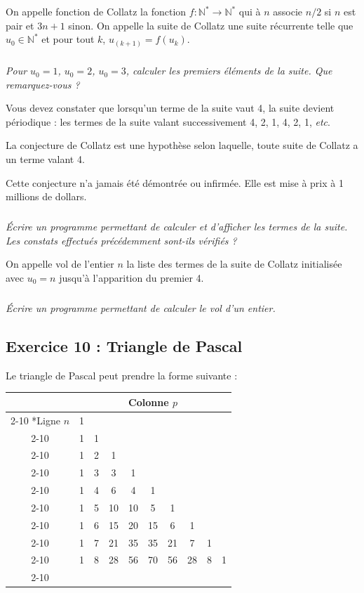 \documentclass[10pt]{article}
\begin{document}
On appelle fonction de Collatz la fonction $f:\mathbb{N}^* \to  \mathbb{N}^*$ qui à $n$ associe $n/2$ si $n$ est pair et $3n+1$ sinon.
On appelle la suite de Collatz une suite récurrente telle que $u_0\in \mathbb{N}^*$ et pour tout $k$, $u_(k+1)=f(u_k)$.

\subparagraph{}
\textit{Pour $u_0=1$, $u_0=2$, $u_0=3$, calculer les premiers éléments de la suite. Que remarquez-vous ?}

\begin{rem}
	Vous devez constater que lorsqu’un terme de la suite vaut 4, la suite devient périodique : les termes de la suite valant successivement 4, 2, 1, 4, 2, 1, \textit{etc}.
	
	La conjecture de Collatz est une hypothèse selon laquelle, toute suite de Collatz a un terme valant 4.
	
	Cette conjecture n’a jamais été démontrée ou infirmée. Elle est mise à prix à 1 millions de dollars.
\end{rem}

\subparagraph{}
\textit{Écrire un programme permettant de calculer et d’afficher les termes de la suite. Les constats effectués précédemment sont-ils vérifiés ?}

On appelle vol de l’entier $n$ la liste des termes de la suite de Collatz initialisée avec $u_0=n$ jusqu’à l’apparition du premier 4. 

\subparagraph{}
\textit{Écrire un programme permettant de calculer le vol d’un entier.}



\subsection*{Exercice 10 : Triangle de Pascal}
\setcounter{subparagraph}{0}

Le triangle de Pascal peut prendre la forme suivante :
\begin{center}
\begin{tabular}{c|c|c|c|c|c|c|c|c|c|}
\multicolumn{1}{c}{}& \multicolumn{9}{c}{Colonne $p$} \\
 \cline{2-10} 
\multirow{9}*{Ligne $n$} & 1 & & & & & & & & \\\cline{2-10} 
& 1 & 1& & & & & & & \\ \cline{2-10} 
& 1 & 2& 1& & & & & & \\ \cline{2-10} 
& 1 & 3& 3& 1& & & & & \\ \cline{2-10} 
& 1 & 4& 6& 4& 1& & & & \\ \cline{2-10} 
& 1 & 5& 10& 10& 5& 1& & & \\ \cline{2-10} 
& 1 & 6& 15& 20& 15& 6& 1& & \\ \cline{2-10} 
& 1 & 7& 21& 35& 35& 21& 7& 1& \\ \cline{2-10} 
& 1 & 8& 28& 56& 70& 56& 28& 8& 1\\ \cline{2-10} 
\end{tabular}
\end{center}
\end{document}
